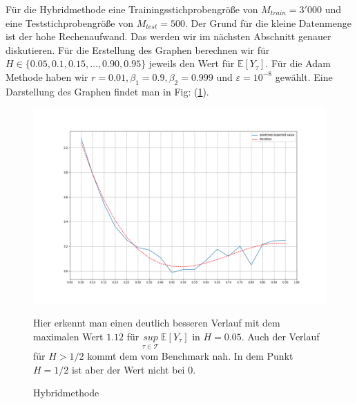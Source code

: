 \documentclass[12pt,titlepage,headsepline]{article}
\begin{document}
      \hfill\break
      Für die Hybridmethode eine Trainingsstichprobengröße von $M_{train}=3'000$ und eine Teststichprobengröße von $M_{test}=500$. Der Grund für die kleine Datenmenge ist der hohe Rechenaufwand. Das werden wir im nächsten Abschnitt genauer diskutieren. Für die Erstellung des Graphen berechnen wir für $H \in \{0.05,0.1,0.15,\ldots,0.90,0.95\}$ jeweils den Wert für $\mathbb{E}[Y_{\tau}]$. Für die Adam Methode haben wir $r = 0.01, \beta_1 = 0.9, \beta_2 = 0.999$ und $\varepsilon = 10^{-8}$ gewählt. Eine Darstellung des Graphen findet man in Fig: (\ref{hybrid_method}).
      \begin{figure}[H]\label{hybrid_method}
        \caption[hybrid_method]{Hybridmethode}
        \includegraphics[width=\textwidth]{hybrid_methode.png}
        {\footnotesize
        Hier erkennt man einen deutlich besseren Verlauf mit dem maximalen Wert $1.12$ für $\underset{\tau \in \mathcal{T}}{sup} \ \mathbb{E}[Y_{\tau}]$ in $H=0.05$. Auch der Verlauf für $H>1/2$ kommt dem vom Benchmark nah. In dem Punkt $H=1/2$ ist aber der Wert nicht bei 0.
        \par}
      \end{figure}
      \newpage
\end{document}
